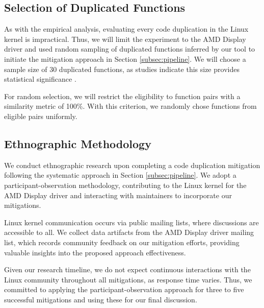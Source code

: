 \subsection{Selection of Duplicated Functions}

As with the empirical analysis, evaluating every code duplication in the Linux kernel is impractical. 
Thus, we will limit the experiment to the AMD Display driver and used random sampling of duplicated functions
inferred by our tool to initiate the mitigation approach in Section \ref{subsec:pipeline}. 
We will choose a sample size of 30 duplicated functions, as studies indicate this size provides 
statistical significance \citep{sample1, sample2}.

For random selection, we will restrict the eligibility to function pairs with a similarity metric of 100\%. 
With this criterion, we randomly chose functions from eligible pairs uniformly.

\subsection{Ethnographic Methodology}

We conduct ethnographic research upon completing a code duplication mitigation following the systematic approach in Section \ref{subsec:pipeline}. We adopt a participant-observation methodology, contributing to the Linux kernel for the AMD Display driver and interacting with maintainers to incorporate our mitigations.

Linux kernel communication occurs via public mailing lists, where discussions are accessible to all. We collect data artifacts from the AMD Display driver mailing list, which records community feedback on our mitigation efforts, providing valuable insights into the proposed approach effectiveness.

Given our research timeline, we do not expect continuous interactions with the Linux community throughout all mitigations, as response time varies. Thus, we committed to applying the participant-observation approach for three to five successful mitigations and using these for our final discussion.
